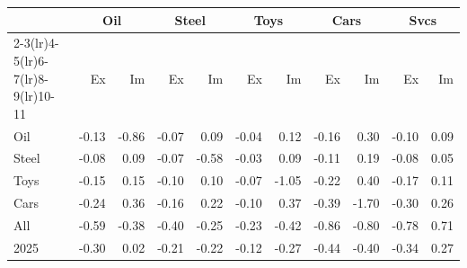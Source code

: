 \begin{tabular}{lrrrrrrrrrr}
\toprule
 & \multicolumn{2}{c}{Oil} & \multicolumn{2}{c}{Steel} & \multicolumn{2}{c}{Toys} & \multicolumn{2}{c}{Cars} & \multicolumn{2}{c}{Svcs} \\
\cmidrule(lr){2-3}\cmidrule(lr){4-5}\cmidrule(lr){6-7}\cmidrule(lr){8-9}\cmidrule(lr){10-11}
 & Ex & Im & Ex & Im & Ex & Im & Ex & Im & Ex & Im \\
\midrule
Oil & -0.13 & -0.86 & -0.07 & 0.09 & -0.04 & 0.12 & -0.16 & 0.30 & -0.10 & 0.09 \\
Steel & -0.08 & 0.09 & -0.07 & -0.58 & -0.03 & 0.09 & -0.11 & 0.19 & -0.08 & 0.05 \\
Toys & -0.15 & 0.15 & -0.10 & 0.10 & -0.07 & -1.05 & -0.22 & 0.40 & -0.17 & 0.11 \\
Cars & -0.24 & 0.36 & -0.16 & 0.22 & -0.10 & 0.37 & -0.39 & -1.70 & -0.30 & 0.26 \\
All & -0.59 & -0.38 & -0.40 & -0.25 & -0.23 & -0.42 & -0.86 & -0.80 & -0.78 & 0.71 \\
2025 & -0.30 & 0.02 & -0.21 & -0.22 & -0.12 & -0.27 & -0.44 & -0.40 & -0.34 & 0.27 \\
\bottomrule
\end{tabular}
